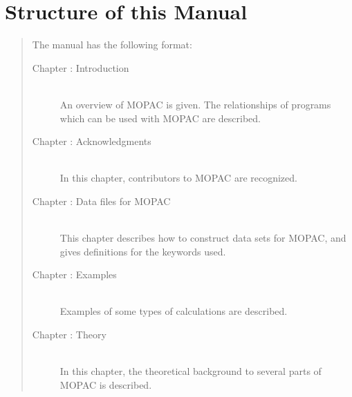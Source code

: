 \section*{Structure of this Manual}
\begin{quote}
The manual has the following format:
\setcounter{chapters}{1}

\begin{description}

\item[Chapter \thechapters : Introduction]~\\
An overview of MOPAC is given. The relationships of programs which can be used
with MOPAC are described.
\addtocounter{chapters}{1}

\item[Chapter \thechapters: Acknowledgments]~\\
In this chapter, contributors to MOPAC are recognized.
\addtocounter{chapters}{1}

\item[Chapter \thechapters: Data files for MOPAC]~\\
This chapter describes how to construct data sets for MOPAC, and gives
definitions for the keywords used.
  \setcounter{datachapter}{\thechapters}
\addtocounter{chapters}{1}




\item[Chapter \thechapters: Examples]~\\
Examples of some types of calculations are described.
\addtocounter{chapters}{1}

\item[Chapter \thechapters: Theory]~\\
In this chapter, the theoretical background to several parts of MOPAC
is described.
  \setcounter{theorychapter}{\thechapters}
\addtocounter{chapters}{1}


\end{description}
\end{quote}
